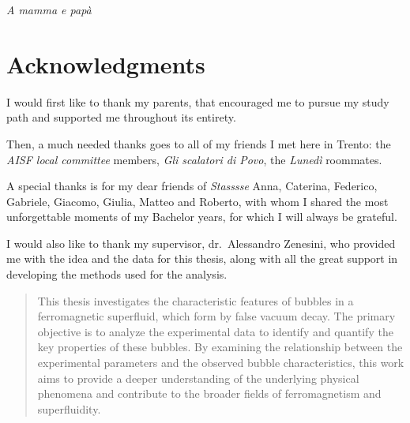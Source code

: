 

\LogoWidth{4.5cm} %

\begin{titlepage}
    \pagestyle{empty}
    \makefrontpage
    \restoregeometry
\end{titlepage}

\thispagestyle{empty} %

\frontmatter
\null{}
\begin{flushright}
    \textit{A mamma e papà}
\end{flushright}
\null

\chapter*{Acknowledgments}
I would first like to thank my parents, that encouraged me to pursue my study path and supported me throughout its entirety. 

Then, a much needed thanks goes to all of my friends I met here in Trento: the \textit{AISF local committee} members, \textit{Gli scalatori di Povo}, the \textit{Lunedì} roommates. 

A special thanks is for my dear friends of \textit{Stasssse} Anna, Caterina, Federico, Gabriele, Giacomo, Giulia, Matteo and Roberto, with whom I shared the most unforgettable moments of my Bachelor years, for which I will always be grateful.

I would also like to thank my supervisor, dr.\ Alessandro Zenesini, who provided me with the idea and the data for this thesis, along with all the great support in developing the methods used for the analysis. 

\begin{abstract}
    This thesis investigates the characteristic features of bubbles in a ferromagnetic superfluid, which form by false vacuum decay. The primary objective is to analyze the experimental data to identify and quantify the key properties of these bubbles. By examining the relationship between the experimental parameters and the observed bubble characteristics, this work aims to provide a deeper understanding of the underlying physical phenomena and contribute to the broader fields of ferromagnetism and superfluidity.
\end{abstract}

